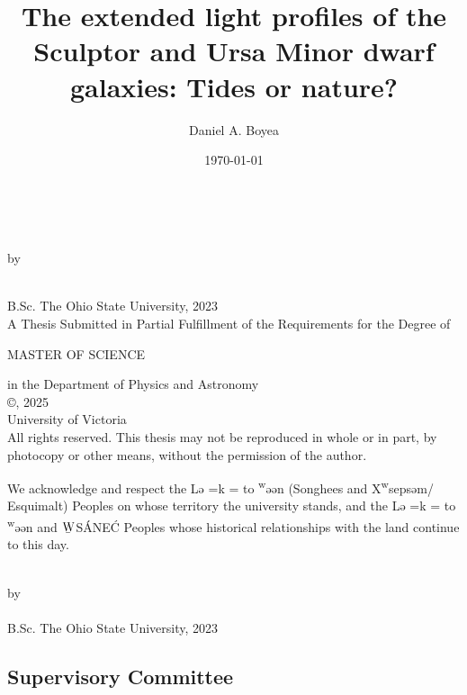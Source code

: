 \documentclass[12pt,oneside,letterpaper]{report}
\title{
    The extended light profiles of the Sculptor and Ursa Minor dwarf galaxies: Tides or nature?
}
\author{Daniel A. Boyea}
\date{\today}
\newcommand{\schwa}{ə}
\newcommand{\Lekwnen}{L\schwa{}\overcomma{k}\textsuperscript{w}\schwa{}\ng{}\schwa{}n}
\newcommand{\skipline}{\vspace{\baselineskip}}
\def\overcomma#1{%
  \setbox0=\hbox{#1}%
  \dimen0=\wd0       %
  \vbox{%
    \hbox to \dimen0{\hfil,\hfil}%
    \nointerlineskip            %
    \box0                       %
  }%
}
\begin{document}


\makeatletter
\begin{titlepage}
   \begin{center}
       \textbf{\large \@title}\\
        \skipline

        by\\
        \skipline

       \@author\\
       B.Sc. The Ohio State University, 2023\\
       \vspace*{3\baselineskip}
    A Thesis Submitted in Partial Fulfillment of the Requirements for the Degree of\\
    \skipline

    MASTER OF SCIENCE \\
    \skipline

    in the Department of Physics and Astronomy\\
       \vfill
       {\small
       ©\@author, 2025\\
       University of Victoria\\
   }
   \skipline
       {\small
       All rights reserved. This thesis may not be reproduced in whole or in part,
   by photocopy or other means, without the permission of the author.} \\
\skipline
   \end{center}
We acknowledge and respect the \Lekwnen{} (Songhees and X\textsuperscript{w}seps\schwa{}m/
Esquimalt) Peoples on whose territory the university stands, and the
\Lekwnen{} and ${\underaccent{\bar}{\rm W}}$S\'ANE\'C Peoples whose historical relationships with the
land continue to this day. 
\end{titlepage}

\addtocounter{page}{1}


\begin{centering}
\textbf{\@title}\\
\skipline
by\\
\skipline
\@author\\
B.Sc. The Ohio State University, 2023\\
\vspace*{3\baselineskip}
\end{centering}

\subsection*{Supervisory Committee}
\skipline
\end{document}
